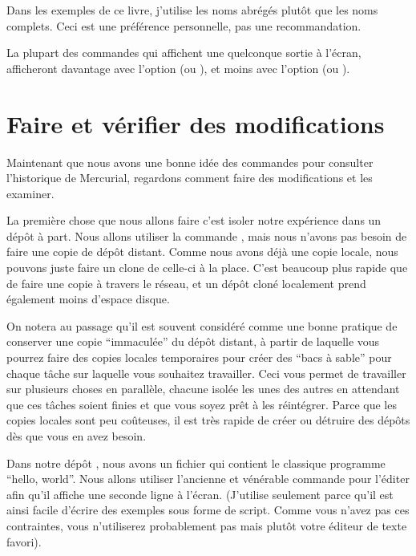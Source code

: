Dans les exemples de ce livre, j'utilise les noms abrégés plutôt que les noms
complets. Ceci est une préférence personnelle, pas une recommandation.

La plupart des commandes qui affichent une quelconque sortie à l'écran,
afficheront davantage avec l'option  (ou ), et
moins avec l'option  (ou ).

\section{Faire et vérifier des modifications}

Maintenant que nous avons une bonne idée des commandes pour consulter 
l'historique de Mercurial, regardons comment faire des modifications et 
les examiner.


La première chose que nous allons faire c'est isoler notre expérience dans
un dépôt à part. Nous allons utiliser la commande , mais nous
n'avons pas besoin de faire une copie de dépôt distant. Comme nous avons 
déjà une copie locale, nous pouvons juste faire un clone de celle-ci à la 
place. C'est beaucoup plus rapide que de faire une copie à travers le 
réseau, et un dépôt cloné localement prend également moins d'espace disque.


On notera au passage qu'il est souvent considéré comme une bonne pratique
de conserver une copie ``immaculée'' du dépôt distant, à partir de laquelle
vous pourrez faire des copies locales temporaires pour créer des ``bacs à 
sable'' pour chaque tâche sur laquelle vous souhaitez travailler. Ceci vous
permet de travailler sur plusieurs choses en parallèle, chacune isolée les 
unes des autres en attendant que ces tâches soient finies et que vous soyez
prêt à les réintégrer. Parce que les copies locales sont peu coûteuses, il
est très rapide de créer ou détruire des dépôts dès que vous en avez besoin.


Dans notre dépôt , nous avons un fichier 
qui contient le classique programme ``hello, world''. Nous allons utiliser 
l'ancienne et vénérable commande  pour l'éditer afin qu'il 
affiche une seconde ligne à l'écran. (J'utilise  seulement parce
qu'il est ainsi facile d'écrire des exemples sous forme de script. Comme 
vous n'avez pas ces contraintes, vous n'utiliserez probablement pas 
mais plutôt votre éditeur de texte favori). 

